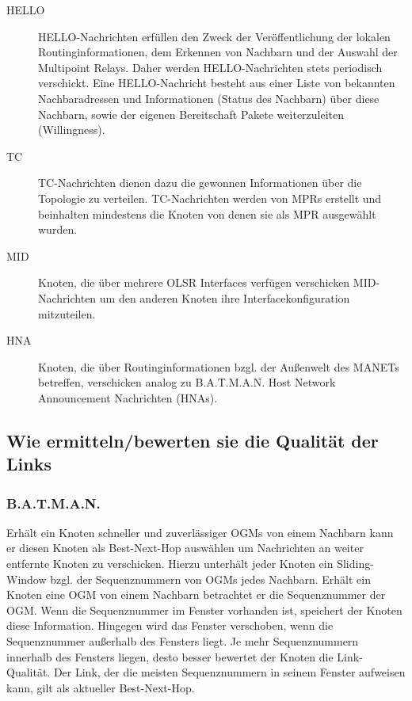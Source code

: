 \documentclass[a4paper,10pt]{article}
\begin{document}
\begin{description}
  \item[HELLO] HELLO-Nachrichten erfüllen den Zweck der Veröffentlichung der lokalen Routinginformationen, dem Erkennen von Nachbarn und der Auswahl der Multipoint Relays. Daher werden HELLO-Nachrichten stets periodisch verschickt. Eine HELLO-Nachricht besteht aus einer Liste von bekannten Nachbaradressen und Informationen (Status des Nachbarn) über diese Nachbarn, sowie der eigenen Bereitschaft Pakete weiterzuleiten (Willingness).
  \item[TC] TC-Nachrichten dienen dazu die gewonnen Informationen über die Topologie zu verteilen. TC-Nachrichten werden von MPRs erstellt und beinhalten mindestens die Knoten von denen sie als MPR ausgewählt wurden.
  \item[MID] Knoten, die über mehrere OLSR Interfaces verfügen verschicken MID-Nachrichten um den anderen Knoten ihre Interfacekonfiguration mitzuteilen.
  \item[HNA] Knoten, die über Routinginformationen bzgl. der Außenwelt des MANETs betreffen, verschicken analog zu B.A.T.M.A.N. Host Network Announcement Nachrichten (HNAs).
\end{description}

\subsection{Wie ermitteln/bewerten sie die Qualität der Links}


\subsubsection*{B.A.T.M.A.N.}

Erhält ein Knoten schneller und zuverlässiger OGMs von einem Nachbarn kann er diesen Knoten als Best-Next-Hop auswählen um Nachrichten an weiter entfernte Knoten zu verschicken.
Hierzu unterhält jeder Knoten ein Sliding-Window bzgl. der Sequenznummern von OGMs jedes Nachbarn. 
Erhält ein Knoten eine OGM von einem Nachbarn betrachtet er die Sequenznummer der OGM.
Wenn die Sequenznummer im Fenster vorhanden ist, speichert der Knoten diese Information.
Hingegen wird das Fenster verschoben, wenn die Sequenznummer außerhalb des Fensters liegt.
Je mehr Sequenznummern innerhalb des Fensters liegen, desto besser bewertet der Knoten die Link-Qualität.
Der Link, der die meisten Sequenznummern in seinem Fenster aufweisen kann, gilt als aktueller Best-Next-Hop.
\end{document}
